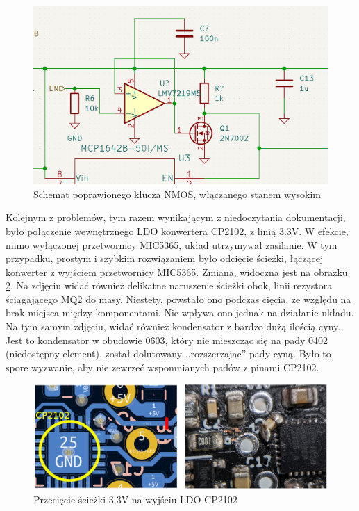 \begin{figure}[H]
    \centering
    \includegraphics[width=\textwidth, height=\textheight, keepaspectratio]{Graphics/fix_gate_3.png}
    \caption{Schemat poprawionego klucza NMOS, włączanego stanem wysokim}
    \label{img:fix_gate_3}
\end{figure}

Kolejnym z problemów, tym razem wynikającym z niedoczytania dokumentacji, było połączenie wewnętrznego LDO konwertera CP2102, z linią 3.3V. W efekcie, mimo wyłączonej przetwornicy MIC5365, układ utrzymywał zasilanie. W tym przypadku, prostym i szybkim rozwiązaniem było odcięcie ścieżki, łączącej konwerter z wyjściem przetwornicy MIC5365. Zmiana, widoczna jest na obrazku \ref{img:fix_ldo_cp}. Na zdjęciu widać również delikatne naruszenie ścieżki obok, linii rezystora ściągającego MQ2 do masy. Niestety, powstało ono podczas cięcia, ze względu na brak miejsca między komponentami. Nie wpływa ono jednak na działanie układu. Na tym samym zdjęciu, widać również kondensator z bardzo dużą ilością cyny. Jest to kondensator w obudowie 0603, który nie mieszcząc się na pady 0402 (niedostępny element), został dolutowany ,,rozszerzając'' pady cyną. Było to spore wyzwanie, aby nie zewrzeć wspomnianych padów z pinami CP2102.
\begin{figure}[H]
    \centering
    \includegraphics[width=\textwidth, height=\textheight, keepaspectratio]{Graphics/fix_ldo_cp.png}
    \caption{Przecięcie ścieżki 3.3V na wyjściu LDO CP2102}
    \label{img:fix_ldo_cp}
\end{figure}


